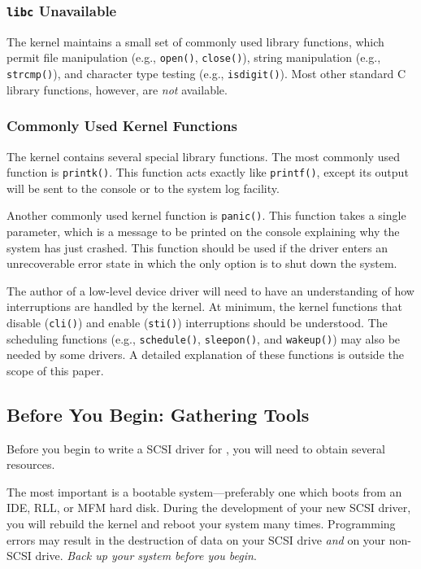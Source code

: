 \subsubsection{{\tt libc} Unavailable}

The kernel maintains a small set of commonly used library functions, which
permit file manipulation (e.g., \verb|open()|, \verb|close()|), string
manipulation (e.g., \verb|strcmp()|), and character type testing (e.g.,
\verb|isdigit()|).  Most other standard C library functions, however, are
{\em not\/} available.


\subsubsection{Commonly Used Kernel Functions}

The kernel contains several special library functions.  The most commonly
used function is \verb|printk()|.  This function acts exactly like
\verb|printf()|, except its output will be sent to the console or to the
system log facility.

Another commonly used kernel function is \verb|panic()|.  This function
takes a single parameter, which is a message to be printed on the console
explaining why the system has just crashed.  This function should be used
if the driver enters an unrecoverable error state in which the only option
is to shut down the system.

The author of a low-level device driver will need to have an understanding
of how interruptions are handled by the kernel.  At minimum, the kernel
functions that disable (\verb|cli()|) and enable (\verb|sti()|)
interruptions should be understood.  The scheduling functions (e.g.,
\verb|schedule()|, \verb|sleepon()|, and \verb|wakeup()|) may also be
needed by some drivers.  A detailed explanation of these functions is
outside the scope of this paper.


\subsection{Before You Begin: Gathering Tools}

Before you begin to write a SCSI driver for \Linux{}, you will need to
obtain several resources.

The most important is a bootable \Linux{} system---preferably one which
boots from an IDE, RLL, or MFM hard disk.  During the development of your
new SCSI driver, you will rebuild the kernel and reboot your system many
times.  Programming errors may result in the destruction of data on your
SCSI drive {\em and\/} on your non-SCSI drive.  {\em Back up your system
  before you begin\/}.


